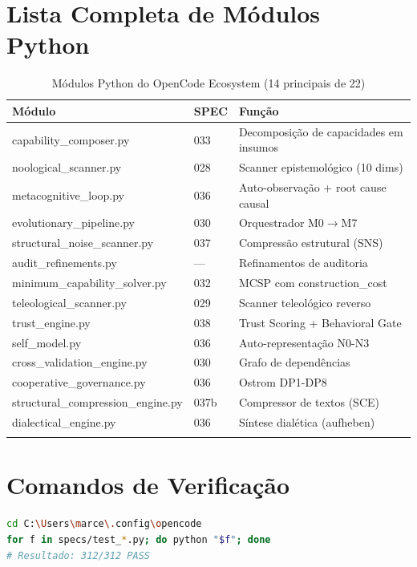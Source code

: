 \begin{apendicesenv}

\chapter{Lista Completa de Módulos Python}

\begin{longtable}{p{5cm}p{2cm}p{6cm}}
\toprule
\textbf{Módulo} & \textbf{SPEC} & \textbf{Função} \\
\midrule
capability\_composer.py & 033 & Decomposição de capacidades em insumos \\
noological\_scanner.py & 028 & Scanner epistemológico (10 dims) \\
metacognitive\_loop.py & 036 & Auto-observação + root cause causal \\
evolutionary\_pipeline.py & 030 & Orquestrador M0$\rightarrow$M7 \\
structural\_noise\_scanner.py & 037 & Compressão estrutural (SNS) \\
audit\_refinements.py & — & Refinamentos de auditoria \\
minimum\_capability\_solver.py & 032 & MCSP com construction\_cost \\
teleological\_scanner.py & 029 & Scanner teleológico reverso \\
trust\_engine.py & 038 & Trust Scoring + Behavioral Gate \\
self\_model.py & 036 & Auto-representação N0-N3 \\
cross\_validation\_engine.py & 030 & Grafo de dependências \\
cooperative\_governance.py & 036 & Ostrom DP1-DP8 \\
structural\_compression\_engine.py & 037b & Compressor de textos (SCE) \\
dialectical\_engine.py & 036 & Síntese dialética (aufheben) \\
\bottomrule
\caption{Módulos Python do OpenCode Ecosystem (14 principais de 22)}
\end{longtable}

\chapter{Comandos de Verificação}

\begin{lstlisting}[language=bash, caption={Script de verificação completa (312 CTs)}]
cd C:\Users\marce\.config\opencode
for f in specs/test_*.py; do python "$f"; done
# Resultado: 312/312 PASS
\end{lstlisting}


\end{apendicesenv}
